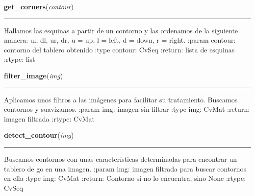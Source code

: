\hspace{.8\funcindent}\begin{boxedminipage}{\funcwidth}

    \raggedright \textbf{get\_corners}(\textit{contour})

    \vspace{-1.5ex}

    \rule{\textwidth}{0.5\fboxrule}
\setlength{\parskip}{2ex}
    Hallamos las esquinas a partir de un contorno y las ordenamos de la 
    siguiente manera: ul, dl, ur, dr.  u = up, l = left, d = down, r = 
    right. :param contour: contorno del tablero obtenido :type contour: 
    CvSeq :return: lista de esquinas :rtype: list

\setlength{\parskip}{1ex}
    \end{boxedminipage}

    \label{src:search_goban:filter_image}

    \vspace{0.5ex}

\hspace{.8\funcindent}\begin{boxedminipage}{\funcwidth}

    \raggedright \textbf{filter\_image}(\textit{img})

    \vspace{-1.5ex}

    \rule{\textwidth}{0.5\fboxrule}
\setlength{\parskip}{2ex}
    Aplicamos unos filtros a las imágenes para facilitar su tratamiento. 
    Buscamos contornos y suavizamos. :param img: imagen sin filtrar :type 
    img: CvMat :return: imagen filtrada :rtype: CvMat

\setlength{\parskip}{1ex}
    \end{boxedminipage}

    \label{src:search_goban:detect_contour}

    \vspace{0.5ex}

\hspace{.8\funcindent}\begin{boxedminipage}{\funcwidth}

    \raggedright \textbf{detect\_contour}(\textit{img})

    \vspace{-1.5ex}

    \rule{\textwidth}{0.5\fboxrule}
\setlength{\parskip}{2ex}
    Buscamos contornos con unas características determinadas para encontrar
    un tablero de go en una imagen. :param img: imagen filtrada para buscar
    contornos en ella :type img: CvMat :return: Contorno si no lo 
    encuentra, sino None :rtype: CvSeq

\setlength{\parskip}{1ex}
    \end{boxedminipage}

